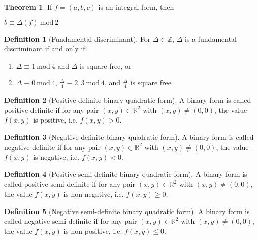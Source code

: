 \documentclass{article}
\theoremstyle{definition}
\newtheorem{definition}{Definition}[section]
\theoremstyle{theorem}
\newtheorem{theorem}{Theorem}[section]
\theoremstyle{example}
\theoremstyle{corollary}
\begin{document}
\theoremstyle{theorem}
\begin{theorem}
If \(f = (a, b, c)\) is an integral form, then
\begin{center}
\(b \equiv \Delta(f) \ \textrm{mod} \ 2\)
\end{center}
\end{theorem}

\bigskip

\theoremstyle{definition}
\begin{definition}[Fundamental discriminant]
For \(\Delta \in \mathbb{Z}\), \(\Delta\) is a fundamental discriminant if and only if:
\begin{enumerate}
\item \(\Delta \equiv 1 \ \textrm{mod} \ 4\) and \(\Delta\) is square free, or
\item \(\Delta \equiv 0 \ \textrm{mod} \ 4\), \(\frac{\Delta}{4} \equiv 2, 3 \ \textrm{mod} \ 4\), and \(\frac{\Delta}{4}\) is square free
\end{enumerate}
\end{definition}

\bigskip

\theoremstyle{definition}
\begin{definition}[Positive definite binary quadratic form]
A binary form is called positive definite if for any pair \((x, y) \in \mathbb{R}^{2}\) with \((x, y) \ne (0, 0)\), the value \(f(x, y)\) is positive, i.e. \(f(x, y) > 0\).
\end{definition}

\bigskip

\theoremstyle{definition}
\begin{definition}[Negative definite binary quadratic form]
A binary form is called negative definite if for any pair \((x, y) \in \mathbb{R}^{2}\) with \((x, y) \ne (0, 0)\), the value \(f(x, y)\) is negative, i.e. \(f(x, y) < 0\).
\end{definition}

\bigskip

\theoremstyle{definition}
\begin{definition}[Positive semi-definite binary quadratic form]
A binary form is called positive semi-definite if for any pair \((x, y) \in \mathbb{R}^{2}\) with \((x, y) \ne (0, 0)\), the value \(f(x, y)\) is non-negative, i.e. \(f(x, y) \ge 0\).
\end{definition}

\bigskip

\theoremstyle{definition}
\begin{definition}[Negative semi-definite binary quadratic form]
A binary form is called negative semi-definite if for any pair \((x, y) \in \mathbb{R}^{2}\) with \((x, y) \ne (0, 0)\), the value \(f(x, y)\) is non-positive, i.e. \(f(x, y) \le 0\).
\end{definition}
\end{document}
